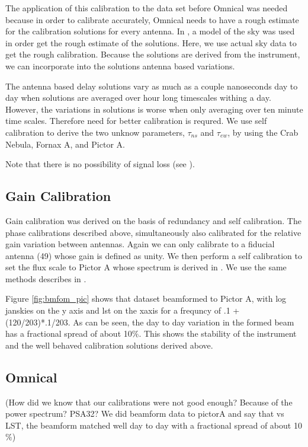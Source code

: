 \documentclass[twocolumn,numberedappendix]{emulateapj}
\begin{document}
The application of this calibration to the data set before Omnical was needed
because in order to calibrate accurately, Omnical needs to have a rough estimate
for the calibration solutions for every antenna. In \cite{zheng_et_al2014}, a
model of the sky was used in order get the rough estimate of the solutions.
Here, we use actual sky data to get the rough calibration. Because the solutions
are derived from the instrument, we can incorporate into the solutions antenna
based variations. 
 
The antenna based
delay solutions vary as much as a couple nanoseconds day to day when solutions
are averaged over hour long timescales withing a day. However, the variations in
solutions is worse when only averaging over ten minute time scales. Therefore
need for better calibration is requred.  We use self calibration to derive the
two unknow parameters, $\tau_{ns}$ and $\tau_{ew}$, by using the Crab Nebula,
Fornax A, and Pictor A.

Note that there is no possibility of signal loss (see \citep{parsons2014}).

\subsection{Gain Calibration}
Gain calibration was derived on the basis of redundancy and self calibration.
The phase calibrations described above, simultaneously also calibrated for the
relative gain variation between antennas. Again we can only calibrate to a fiducial
antenna (49) whose gain is defined as unity. We then perform a self calibration
to set the flux scale to Pictor A whose spectrum is derived in
\citep{jacops_2013}. We use the same methods describes in \citep{Parsons 2014}.

Figure \ref{fig:bmfom_pic} shows that dataset beamformed to Pictor A, with log
janskies on the y axis and lst on the xaxis for a frequncy of .1 + (120/203)*.1/203. 
As can be seen, the day to day variation in the formed beam has a fractional
spread of about 10$\%$.  This shows the stability of the instrument and the well
behaved calibration solutions derived above. 

\subsection{Omnical}
(How did we know that our calibrations were not good enough? Because of the power
spectrum? PSA32? We did beamform data to pictorA and say that vs LST, the
beamform matched well day to day with a fractional spread of about 10$\%$) 
\end{document}
